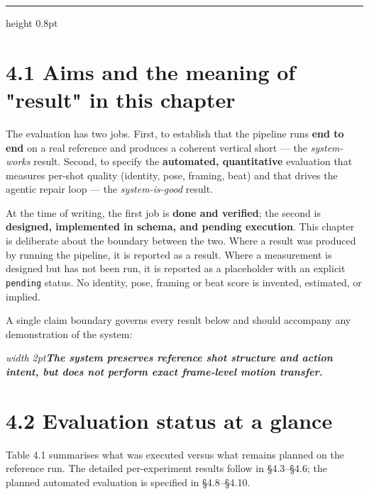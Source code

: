 \documentclass[10pt,twocolumn,letterpaper]{article}
\newenvironment{quotebox}%
 {\par\vspace{3pt}\noindent\begin{list}{}{\setlength{\leftmargin}{1em}\setlength{\rightmargin}{0.5em}}\item\footnotesize\itshape\color{black!80}\hspace*{-0.6em}\vrule width 2pt\hspace{0.6em}\ignorespaces}%
 {\end{list}\vspace{3pt}}
\begin{document}
\vspace*{2pt}\vspace{3pt}\hrule height 0.8pt\vspace{12pt}


\section*{4.1 Aims and the meaning of "result" in this chapter}

The evaluation has two jobs. First, to establish that the pipeline runs \textbf{end to end} on a real reference and produces a coherent vertical short --- the \emph{system-works} result. Second, to specify the \textbf{automated, quantitative} evaluation that measures per-shot quality (identity, pose, framing, beat) and that drives the agentic repair loop --- the \emph{system-is-good} result.

At the time of writing, the first job is \textbf{done and verified}; the second is \textbf{designed, implemented in schema, and pending execution}. This chapter is deliberate about the boundary between the two. Where a result was produced by running the pipeline, it is reported as a result. Where a measurement is designed but has not been run, it is reported as a placeholder with an explicit \texttt{pending} status. No identity, pose, framing or beat score is invented, estimated, or implied.

A single claim boundary governs every result below and should accompany any demonstration of the system:

\begin{quotebox}\textbf{The system preserves reference shot structure and action intent, but does not perform exact frame-level motion transfer.}\end{quotebox}


\section*{4.2 Evaluation status at a glance}

Table 4.1 summarises what was executed versus what remains planned on the reference run. The detailed per-experiment results follow in \S{}4.3--\S{}4.6; the planned automated evaluation is specified in \S{}4.8--\S{}4.10.
\end{document}
